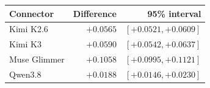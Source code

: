 \begin{tabular}{lrr}
\toprule
Connector & Difference & 95\% interval\\
\midrule
Kimi K2.6 & $+0.0565$ & $[+0.0521, +0.0609]$\\
Kimi K3 & $+0.0590$ & $[+0.0542, +0.0637]$\\
Muse Glimmer & $+0.1058$ & $[+0.0995, +0.1121]$\\
Qwen3.8 & $+0.0188$ & $[+0.0146, +0.0230]$\\
\bottomrule
\end{tabular}
